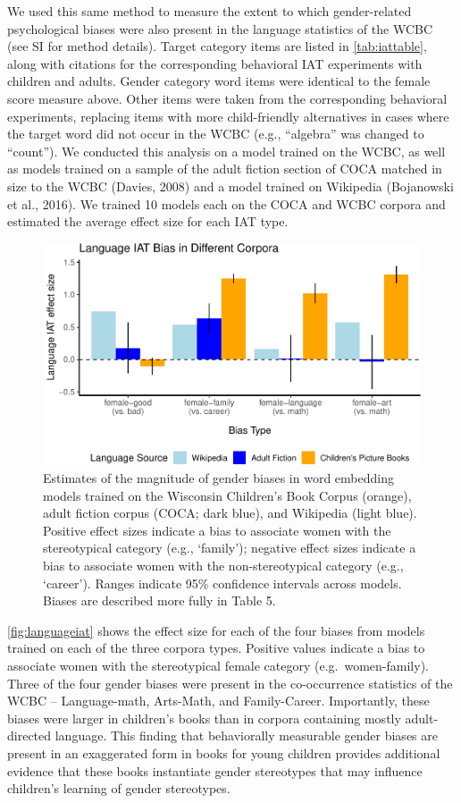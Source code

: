 \documentclass[english,,man,floatsintext]{apa6}
\begin{document}
We used this same method to measure the extent to which gender-related psychological biases were also present in the language statistics of the WCBC (see SI for method details). Target category items are listed in \autoref{tab:iattable}, along with citations for the corresponding behavioral IAT experiments with children and adults. Gender category word items were identical to the female score measure above. Other items were taken from the corresponding behavioral experiments, replacing items with more child-friendly alternatives in cases where the target word did not occur in the WCBC (e.g., \enquote{algebra} was changed to \enquote{count}). We conducted this analysis on a model trained on the WCBC, as well as models trained on a sample of the adult fiction section of COCA matched in size to the WCBC (Davies, 2008) and a model trained on Wikipedia (Bojanowski et al., 2016). We trained 10 models each on the COCA and WCBC corpora and estimated the average effect size for each IAT type.

\begin{figure}[t!]
\includegraphics[width=\textwidth,]{kidbookgender_files/figure-latex/languageiat-1} \caption{Estimates of the magnitude of gender biases in word embedding models trained on the Wisconsin Children’s Book Corpus (orange), adult fiction corpus (COCA; dark blue), and Wikipedia (light blue). Positive effect sizes indicate a bias to associate women with the stereotypical category (e.g., ‘family'); negative effect sizes indicate a bias to associate women with the non-stereotypical category (e.g., ‘career’).  Ranges indicate 95\% confidence intervals across models. Biases are described more fully in Table 5.}\label{fig:languageiat}
\end{figure}

\autoref{fig:languageiat} shows the effect size for each of the four biases from models trained on each of the three corpora types. Positive values indicate a bias to associate women with the stereotypical female category (e.g.~women-family). Three of the four gender biases were present in the co-occurrence statistics of the WCBC -- Language-math, Arts-Math, and Family-Career. Importantly, these biases were larger in children's books than in corpora containing mostly adult-directed language. This finding that behaviorally measurable gender biases are present in an exaggerated form in books for young children provides additional evidence that these books instantiate gender stereotypes that may influence children's learning of gender stereotypes.
\end{document}
